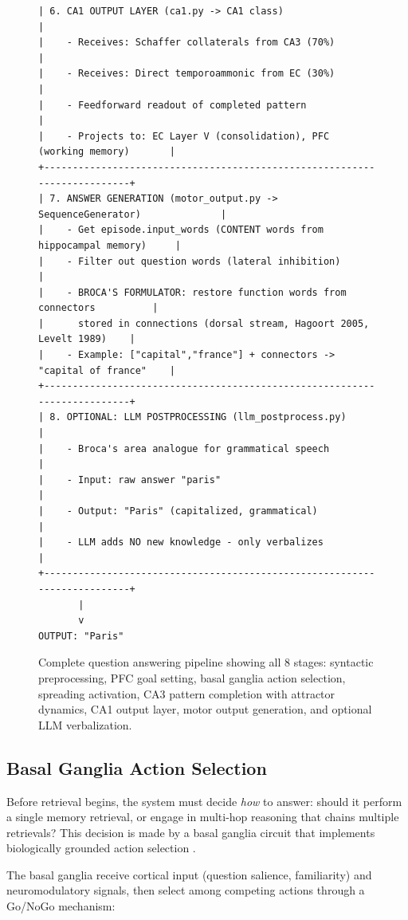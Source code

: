 \documentclass[11pt]{article}
\begin{document}
\begin{figure}[ht]
\begin{Verbatim}[fontsize=\tiny,frame=single]
| 6. CA1 OUTPUT LAYER (ca1.py -> CA1 class)                                |
|    - Receives: Schaffer collaterals from CA3 (70%)                       |
|    - Receives: Direct temporoammonic from EC (30%)                       |
|    - Feedforward readout of completed pattern                            |
|    - Projects to: EC Layer V (consolidation), PFC (working memory)       |
+--------------------------------------------------------------------------+
| 7. ANSWER GENERATION (motor_output.py -> SequenceGenerator)              |
|    - Get episode.input_words (CONTENT words from hippocampal memory)     |
|    - Filter out question words (lateral inhibition)                      |
|    - BROCA'S FORMULATOR: restore function words from connectors          |
|      stored in connections (dorsal stream, Hagoort 2005, Levelt 1989)    |
|    - Example: ["capital","france"] + connectors -> "capital of france"    |
+--------------------------------------------------------------------------+
| 8. OPTIONAL: LLM POSTPROCESSING (llm_postprocess.py)                     |
|    - Broca's area analogue for grammatical speech                        |
|    - Input: raw answer "paris"                                           |
|    - Output: "Paris" (capitalized, grammatical)                          |
|    - LLM adds NO new knowledge - only verbalizes                         |
+--------------------------------------------------------------------------+
       |
       v
OUTPUT: "Paris"
\end{Verbatim}
\caption{Complete question answering pipeline showing all 8 stages: syntactic preprocessing, PFC goal setting, basal ganglia action selection, spreading activation, CA3 pattern completion with attractor dynamics, CA1 output layer, motor output generation, and optional LLM verbalization.}
\label{fig:inference}
\end{figure}

\subsection{Basal Ganglia Action Selection}

Before retrieval begins, the system must decide \emph{how} to answer: should it perform a single memory retrieval, or engage in multi-hop reasoning that chains multiple retrievals? This decision is made by a basal ganglia circuit that implements biologically grounded action selection \citep{frank2006making,mink1996basal}.

The basal ganglia receive cortical input (question salience, familiarity) and neuromodulatory signals, then select among competing actions through a Go/NoGo mechanism:
\end{document}
